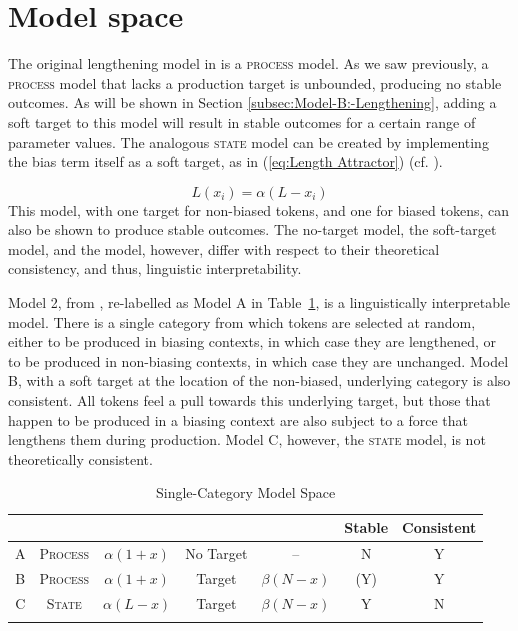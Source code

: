 \section{\label{sec:Model-Interpretation}Model space}

The original lengthening model in 
is a \textsc{process} model. As we saw previously, a \textsc{process}
model that lacks a production target is unbounded, producing no stable
outcomes. As will be shown in Section \ref{subsec:Model-B:-Lengthening},
adding a soft target to this model will result in stable outcomes
for a certain range of parameter values. The analogous \textsc{state}
model can be created by implementing the bias term itself as a soft
target, as in (\ref{eq:Length Attractor}) (cf. \citealt{soskuthy2013phonetic}). 

\begin{equation}
L(x_{i})=\alpha(L-x_{i})\label{eq:Length Attractor}
\end{equation}
This model, with one target for non-biased tokens, and one for biased
tokens, can also be shown to produce stable outcomes. The no-target
 model, the soft-target  model, and the
 model, however, differ with respect to their theoretical
consistency, and thus, linguistic interpretability. 

Model 2, from , re-labelled
as Model A in Table~\ref{tab: Model Comparison-1}, is a linguistically
interpretable model. There is a single category from which tokens
are selected at random, either to be produced in biasing contexts,
in which case they are lengthened, or to be produced in non-biasing
contexts, in which case they are unchanged. Model B, with a soft target
at the location of the non-biased, underlying category is also consistent.
All tokens feel a pull towards this underlying target, but those that
happen to be produced in a biasing context are also subject to a force
that lengthens them during production. Model C, however, the \textsc{state}
model, is not theoretically consistent. 

\begin{table}[h]\footnotesize
\caption{Single-Category Model Space\label{tab: Model Comparison-1}}
\begin{tabular}{ccccccc}
\lsptoprule
 & \multicolumn{2}{c}{} & \multicolumn{2}{c}{} & Stable & Consistent\tabularnewline
\midrule
A & \textsc{Process} & $\alpha(1+x)$ & No Target & – & N & Y\tabularnewline
B & \textsc{Process} & $\alpha(1+x)$ & Target & $\beta(N-x)$ & (Y) & Y\tabularnewline
C & \textsc{State} & $\alpha(L-x)$ & Target & $\beta(N-x)$ & Y & N\tabularnewline
\lspbottomrule
\end{tabular}
\end{table}

